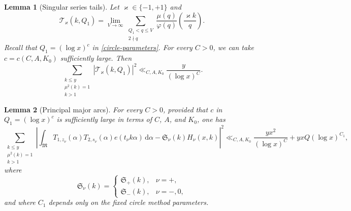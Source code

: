 \documentclass[10pt,a4paper]{amsart}
\newtheorem{lemma}{Lemma}
\newcommand{\dif}{\mathrm{d}}
\newcommand{\majorarc}{\mathfrak{M}}
\begin{document}
\begin{lemma}[Singular series tails]\label{lem:tail-bound}
Let $\varkappa\in\{-1,+1\}$ and
\[
 \mathcal T_\varkappa(k,Q_1)=
 \lim_{V\to\infty}
 \sum_{\substack{Q_1<q\leq V\\2\nmid q}}
 \frac{\mu(q)}{\varphi(q)}
 \left(\frac{\varkappa k}{q}\right).
\]
Recall that $Q_1=(\log x)^c$ in \eqref{circle-parameters}.
For every $C>0$, we can take $c=c(C,A,K_0)$ sufficiently large.  Then
\begin{equation}\label{tail-second-moment}
 \sum_{\substack{k\leq y\\\mu^2(k)=1\\k>1}}
 |\mathcal T_\varkappa(k,Q_1)|^2
 \ll_{C,A,K_0}\frac{y}{(\log x)^C}.
\end{equation}
\end{lemma}

\begin{lemma}[Principal major arcs]\label{lem:principal-arcs}
For every $C>0$, provided that $c$ in $Q_1=(\log x)^c$
is sufficiently large in terms of $C$, $A$, and $K_0$, one has
\begin{equation}\label{principal-L2}
 \sum_{\substack{k\leq y\\\mu^2(k)=1\\k>1}}
 \left|\int_{\majorarc}T_{1,z_\nu}(\alpha)T_{2,s_\nu}(\alpha)
 e(t_\nu k\alpha)\,\dif\alpha
 -\mathfrak S_\nu(k)H_\nu(x,k)\right|^2
 \ll_{C,A,K_0}
 \frac{yx^2}{(\log x)^C}+yxQ(\log x)^{C_1},
\end{equation}
where
\[
 \mathfrak S_\nu(k)=
 \begin{cases}
  \mathfrak S_+(k),&\nu=+,\\
  \mathfrak S_-(k),&\nu=-,0,
 \end{cases}
\]
and where $C_1$ depends only on the fixed circle method parameters.
\end{lemma}
\end{document}
